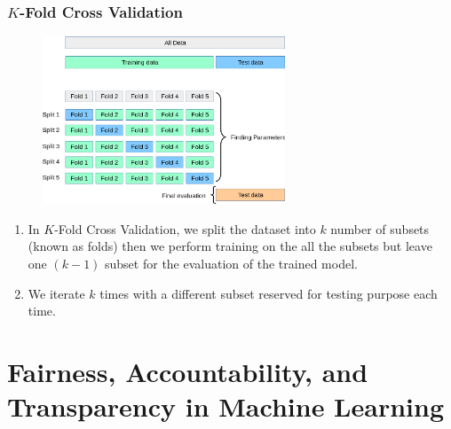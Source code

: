 \subsubsection{$K$-Fold Cross Validation \cite{geeksforgeeks/cross-validation-machine-learning/}} \label{Cross-Validation: K-Fold Cross Validation}

\begin{table}[H]
    \begin{minipage}{0.38\linewidth}
        \begin{figure}[H]
            \centering
            \includegraphics[width=\linewidth, height=5cm, keepaspectratio]{Pictures/ai-ml/grid_search_cross_validation.png}
        \end{figure}
    \end{minipage}
    \hfill
    \begin{minipage}{0.58\linewidth}
        \begin{enumerate}
            \item In $K$-Fold Cross Validation, we split the dataset into $k$ number of subsets (known as folds) then we perform training on the all the subsets but leave one $(k-1)$ subset for the evaluation of the trained model. 
            
            \item  We iterate $k$ times with a different subset reserved for testing purpose each time.
        
        \end{enumerate}
    \end{minipage}
\end{table}


\section{Fairness, Accountability, and Transparency in Machine Learning} \label{Fairness, Accountability, and Transparency in Machine Learning}

